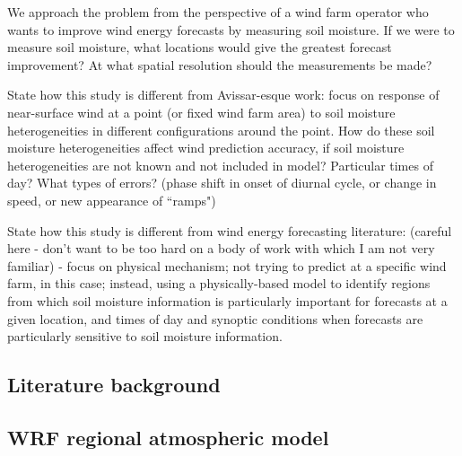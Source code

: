 \documentclass[12pt]{amsart}
\begin{document}
We approach the problem from the perspective of a wind farm operator who wants to improve wind energy forecasts by measuring soil moisture.  If we were to measure soil moisture, what locations would give the greatest forecast improvement?  At what spatial resolution should the measurements be made?

State how this study is different from Avissar-esque work: focus on response of near-surface wind at a point (or fixed wind farm area) to soil moisture heterogeneities in different configurations around the point.  How do these soil moisture heterogeneities affect wind prediction accuracy, if soil moisture heterogeneities are not known and not included in model?  Particular times of day?  What types of errors?  (phase shift in onset of diurnal cycle, or change in speed, or new appearance of ``ramps")

State how this study is different from wind energy forecasting literature: (careful here - don't want to be too hard on a body of work with which I am not very familiar) - focus on physical mechanism; not trying to predict at a specific wind farm, in this case; instead, using a physically-based model to identify regions from which soil moisture information is particularly important for forecasts at a given location, and times of day and synoptic conditions when forecasts are particularly sensitive to soil moisture information.

\subsection{Literature background}

\subsection{WRF regional atmospheric model}
\end{document}

